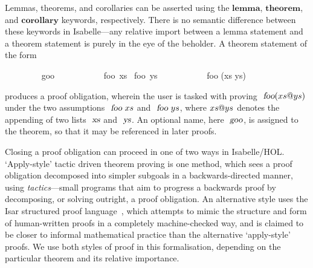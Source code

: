 \documentclass[acmlarge,review,anonymous]{acmart}\settopmatter{printfolios=true}
\begin{document}
Lemmas, theorems, and corollaries can be asserted using the $\mathbf{lemma}$, $\mathbf{theorem}$, and $\mathbf{corollary}$ keywords, respectively.
There is no semantic difference between these keywords in Isabelle---any relative import between a lemma statement and a theorem statement is purely in the eye of the beholder.
A theorem statement of the form
\\
\begin{isabellebody}
\ \ \ \ \ \ \ \  goo{\isacharcolon}\isanewline
\ \ \ \ \ \ \ \ \ \ \ foo\ xs \ foo\ ys \isanewline
\ \ \ \ \ \ \ \ \ \ \ foo (xs \isacharat ys)
\end{isabellebody}
\vspace{\baselineskip}
\noindent
produces a proof obligation, wherein the user is tasked with proving $\isa{foo} (xs \isacharat ys)$ under the two assumptions $\isa{foo}\ xs$ and $\isa{foo}\ ys$, where $xs \emph{$@$} ys$ denotes the appending of two lists $\isa{xs}$ and $\isa{ys}$.
An optional name, here $\isa{goo}$, is assigned to the theorem, so that it may be referenced in later proofs.

Closing a proof obligation can proceed in one of two ways in Isabelle/HOL.
`Apply-style' tactic driven theorem proving is one method, which sees a proof obligation decomposed into simpler subgoals in a backwards-directed manner, using \emph{tactics}---small programs that aim to progress a backwards proof by decomposing, or solving outright, a proof obligation.
An alternative style uses the Isar structured proof language~\cite{DBLP:phd/dnb/Wenzel02a}, which attempts to mimic the structure and form of human-written proofs in a completely machine-checked way, and is claimed to be closer to informal mathematical practice than the alternative `apply-style' proofs.
We use both styles of proof in this formalisation, depending on the particular theorem and its relative importance.
\end{document}

